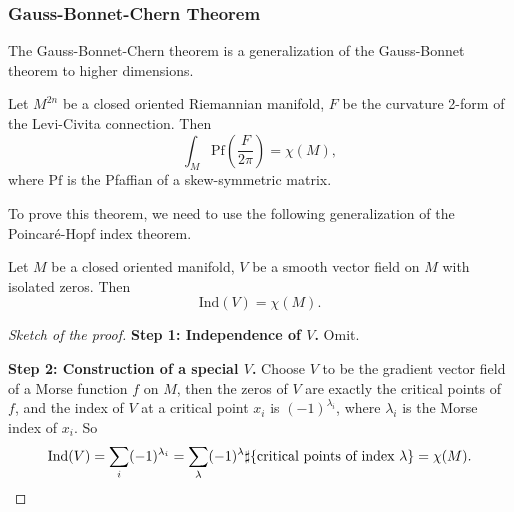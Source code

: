 \subsubsection*{Gauss-Bonnet-Chern Theorem}
The Gauss-Bonnet-Chern theorem is a generalization of the Gauss-Bonnet theorem to higher dimensions. 
\begin{theorem}
    Let $M^{2n}$ be a closed oriented Riemannian manifold, 
    $F$ be the curvature 2-form of the Levi-Civita connection. Then 
    \begin{equation*}
        \int_M \mathrm{Pf}\left(\frac{F}{2\pi}\right) = \chi(M),
    \end{equation*}
    where $\mathrm{Pf}$ is the Pfaffian of a skew-symmetric matrix.
\end{theorem}
To prove this theorem, we need to use the following generalization of the Poincar\'e-Hopf index theorem. 
\begin{theorem}
    Let $M$ be a closed oriented manifold, 
    $V$ be a smooth vector field on $M$ with isolated zeros. Then 
    \begin{equation*}
        \mathrm{Ind}(V) = \chi(M).
    \end{equation*}
\end{theorem}
\begin{proof}[Sketch of the proof]\hfill

    \textbf{Step 1: Independence of $V$.} Omit.

    \textbf{Step 2: Construction of a special $V$.} Choose $V$ to be the gradient vector field of a Morse function $f$ on $M$, 
    then the zeros of $V$ are exactly the critical points of $f$, 
    and the index of $V$ at a critical point $x_i$ is $(-1)^{\lambda_i}$, 
    where $\lambda_i$ is the Morse index of $x_i$. So 
    \begin{equation*}
        \mathrm{Ind}(V) = \sum_i (-1)^{\lambda_i} 
        = \sum_{\lambda}(-1)^{\lambda}\sharp\{\text{critical points of index }\lambda\} 
        = \chi(M). \qedhere
    \end{equation*}
\end{proof}
